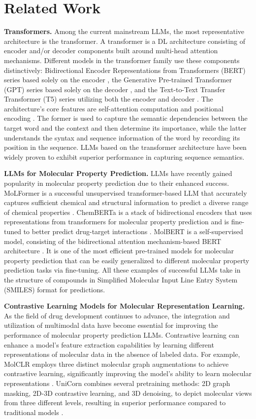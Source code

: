 \section{Related Work}
\textbf{Transformers.} Among the current mainstream LLMs, the most representative architecture is the transformer. A transformer is a DL architecture consisting of encoder and/or decoder components built around multi-head attention mechanisms. Different models in the transformer family use these components distinctively: Bidirectional Encoder Representations from Transformers (BERT) series based solely on the encoder \citep{devlin2019bertpretrainingdeepbidirectional}, the Generative Pre-trained Transformer (GPT) series based solely on the decoder \citep{radford2018improving}, and the Text-to-Text Transfer Transformer (T5) series utilizing both the encoder and decoder \citep{raffel2020exploring}. The architecture's core features are self-attention computation and positional encoding \citep{vaswani}. The former is used to capture the semantic dependencies between the target word and the context and then determine its importance, while the latter understands the syntax and sequence information of the word by recording its position in the sequence. LLMs based on the transformer architecture have been widely proven to exhibit superior performance in capturing sequence semantics.

\textbf{LLMs for Molecular Property Prediction.} LLMs have recently gained popularity in molecular property prediction due to their enhanced success. MoLFormer is a successful unsupervised transformer-based LLM that accurately captures sufficient chemical and structural information to predict a diverse range of chemical properties \citep{ross2022large}. ChemBERTa is a stack of bidirectional encoders that uses representations from transformers for molecular property prediction \citep{chemberta} and is fine-tuned to better predict drug-target interactions \citep{kang2022fine}. MolBERT is a self-supervised model, consisting of the bidirectional attention mechanism-based BERT architecture \citep{molbert}. It is one of the most efficient pre-trained models for molecular property prediction that can be easily generalized to different molecular property prediction tasks via fine-tuning. All these examples of successful LLMs take in the structure of compounds in Simplified Molecular Input Line Entry System (SMILES) format for predictions.

\textbf{Contrastive Learning Models for Molecular Representation Learning.} As the field of drug development continues to advance, the integration and utilization of multimodal data have become essential for improving the performance of molecular property prediction LLMs. Contrastive learning can enhance a model's feature extraction capabilities by learning different representations of molecular data in the absence of labeled data. For example, MolCLR employs three distinct molecular graph augmentations to achieve contrastive learning, significantly improving the model's ability to learn molecular representations \citep{wang2022molecular}. UniCorn combines several pretraining methods: 2D graph masking, 2D-3D contrastive learning, and 3D denoising, to depict molecular views from three different levels, resulting in superior performance compared to traditional models \citep{unicorn}.